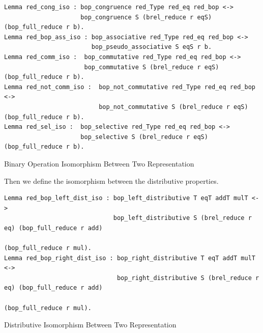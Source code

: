 \documentclass[a4paper,12pt,twoside,openright]{report}
\begin{document}
\begin{listing}[H]
\begin{verbatim}
Lemma red_cong_iso : bop_congruence red_Type red_eq red_bop <-> 
                     bop_congruence S (brel_reduce r eqS) (bop_full_reduce r b).
Lemma red_bop_ass_iso : bop_associative red_Type red_eq red_bop <-> 
                        bop_pseudo_associative S eqS r b. 
Lemma red_comm_iso :  bop_commutative red_Type red_eq red_bop <-> 
                      bop_commutative S (brel_reduce r eqS) (bop_full_reduce r b).
Lemma red_not_comm_iso :  bop_not_commutative red_Type red_eq red_bop <-> 
                          bop_not_commutative S (brel_reduce r eqS) (bop_full_reduce r b).
Lemma red_sel_iso :  bop_selective red_Type red_eq red_bop <-> 
                     bop_selective S (brel_reduce r eqS) (bop_full_reduce r b).
\end{verbatim}
\caption{Binary Operation Isomorphism Between Two Representation} 
\label{coq:proof:bop_iso}
\end{listing}

Then we define the isomorphism between the distributive properties.
\begin{listing}[H]
\begin{verbatim}
Lemma red_bop_left_dist_iso : bop_left_distributive T eqT addT mulT <-> 
                              bop_left_distributive S (brel_reduce r eq) (bop_full_reduce r add) 
                                                                         (bop_full_reduce r mul).
Lemma red_bop_right_dist_iso : bop_right_distributive T eqT addT mulT <-> 
                               bop_right_distributive S (brel_reduce r eq) (bop_full_reduce r add) 
                                                                           (bop_full_reduce r mul).                                                                         
\end{verbatim}
\caption{Distributive Isomorphism Between Two Representation} 
\label{coq:proof:distributive_iso}
\end{listing}
\end{document}
